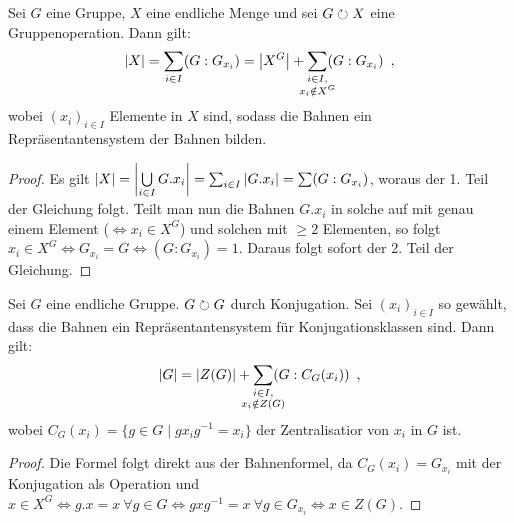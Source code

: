 \documentclass[12pt,a4paper]{scrartcl}
\begin{document}
\begin{satz}[Bahnenformel] \label{thm:bahnformel}
	Sei $G$ eine Gruppe, $X$ eine endliche Menge und sei $G\operates X$ eine Gruppenoperation. Dann gilt: $$|X| = \sum_{i\in I}(G:G_{x_i}) = \abs*{X^G} + \sum_{\mathclap{\substack{i\in I,\\x_i\notin X^G}}}(G:G_{x_i})\enspace,$$ wobei $(x_i)_{i\in I}$ Elemente in $X$ sind, sodass die Bahnen ein Repräsentantensystem der Bahnen bilden.
\end{satz}

\begin{proof} Es gilt $|X| = \abs*{\bigcup\limits_{i\in I} G.x_i} = \sum_{i\in I}|G.x_i| = \sum (G:G_{x_i})$, woraus der 1. Teil der Gleichung folgt. Teilt man nun die Bahnen $G.x_i$ in solche auf mit genau einem Element ($\Leftrightarrow x_i\in X^G$) und solchen mit $\geq 2$ Elementen, so folgt $x_i\in X^G\Leftrightarrow G_{x_i} = G\Leftrightarrow (G:G_{x_i}) = 1$. Daraus folgt sofort der 2. Teil der Gleichung.
\end{proof}

\begin{satz}
	Sei $G$ eine endliche Gruppe. $G\operates G$ durch Konjugation. Sei $(x_i)_{i\in I}$ so gewählt, dass die Bahnen ein Repräsentantensystem für Konjugationsklassen sind. Dann gilt: \[ |G|  = |Z(G)| + \sum_{\mathclap{\substack{i\in I,\\x_i\notin Z(G)}}}(G: C_G(x_i))\enspace ,\] wobei $C_G(x_i) = \{g\in G\mid gx_ig^{-1} = x_i\}$ der Zentralisatior von $x_i$ in $G$ ist.
\end{satz}

\begin{proof}
	Die Formel folgt direkt aus der Bahnenformel, da $C_G(x_i) = G_{x_i}$ mit der Konjugation als Operation und $x\in X^G\Leftrightarrow g.x = x~\forall g\in G\Leftrightarrow gxg^{-1} = x~\forall g\in G_{x_i}\Leftrightarrow x\in Z(G)$.
\end{proof}

\end{document}
